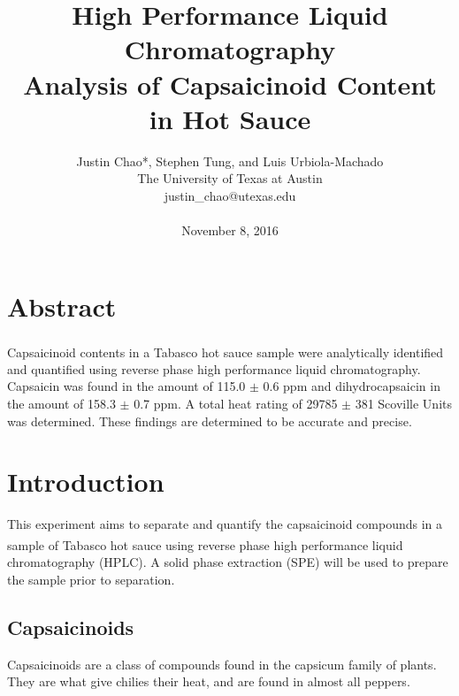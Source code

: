 \documentclass{article}
\title{High Performance Liquid Chromatography \\Analysis of Capsaicinoid
Content in Hot Sauce}
\author{{Justin Chao*, Stephen Tung, and Luis Urbiola-Machado}\\[2ex]
The University of Texas at Austin \\ 
justin\_chao@utexas.edu \\ \\
November 8, 2016}
\date{}
\begin{document}
\maketitle
\unskip\vspace{1.5\baselineskip}


\begin{multicols}{2}

{\fontsize{9.5}{12}\selectfont   

\section*{Abstract} 
    Capsaicinoid contents in a Tabasco\textsuperscript{\textregistered} hot
    sauce sample were analytically identified and quantified using reverse phase
    high performance liquid chromatography. Capsaicin was found in the amount of
    115.0 $\pm$ 0.6 ppm and dihydrocapsaicin in the amount of 158.3 $\pm$ 0.7
    ppm. A total heat rating of 29785 $\pm$ 381 Scoville Units was determined.
    These findings are determined to be accurate and precise.

\section*{Introduction}
This experiment aims to separate and quantify the capsaicinoid compounds in a
sample of Tabasco\textsuperscript{\textregistered} hot sauce using reverse
phase high performance liquid chromatography (HPLC). A solid phase
extraction (SPE) will be used to prepare the sample prior to separation.

\subsection*{Capsaicinoids}
Capsaicinoids are a class of compounds found in the capsicum family of plants.
    They are what give chilies their heat, and are found in almost all peppers.

}
\end{multicols}
\end{document}
